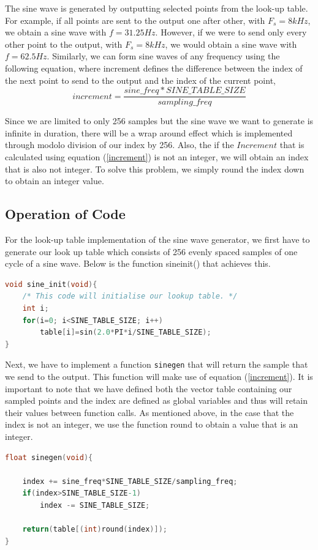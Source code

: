 \documentclass{article}
\begin{document}
The sine wave is generated by outputting selected points from the look-up table. For example, if all points are sent to the output one after other, with $F_{s}=8kHz$, we obtain a sine wave with $f=31.25Hz$. However, if we were to send only every other point to the output, with $F_{s}=8kHz$, we would obtain a sine wave with $f=62.5Hz$. Similarly, we can form sine waves of any frequency using the following equation, where increment defines the difference between the index of the next point to send to the output and the index of the current point,
\begin{equation} \label{increment}
    increment= \frac{sine\_freq * SINE\_TABLE \_SIZE}{sampling\_freq}
\end{equation}


Since we are limited to only 256 samples but the sine wave we want to generate is infinite in duration, there will be a wrap around effect which is implemented through modolo division of our index by 256. Also, the if the $Increment$ that is calculated using equation (\ref{increment}) is not an integer, we will obtain an index that is also not integer. To solve this problem, we simply round the index down to obtain an integer value.
\subsection{Operation of Code}
For the look-up table implementation of the sine wave generator, we first have to generate our look up table which consists of 256 evenly spaced samples of one cycle of a sine wave. Below is the function sine\textunderscore init() that achieves this. \\
\begin{lstlisting}[language=C, frame=single, caption=Initialization of Look-Up Table]
void sine_init(void){
    /* This code will initialise our lookup table. */
    int i;
    for(i=0; i<SINE_TABLE_SIZE; i++)
        table[i]=sin(2.0*PI*i/SINE_TABLE_SIZE);
}
\end{lstlisting}

Next, we have to implement a function {\tt sinegen} that will return the sample that we send to the output. This function will make use of equation (\ref{increment}). It is important to note that we have defined both the vector table containing our sampled points and the index are defined as global variables and thus will retain their values between function calls. As mentioned above, in the case that the index is not an integer, we use the function round to obtain a value that is an integer.\\
\begin{lstlisting}[language=C, frame=single, caption=Code that Returns Value Sent to Output]
float sinegen(void){
	
    index += sine_freq*SINE_TABLE_SIZE/sampling_freq;
    if(index>SINE_TABLE_SIZE-1)
        index -= SINE_TABLE_SIZE;
		
    return(table[(int)round(index)]);
}
\end{lstlisting}
\end{document}
